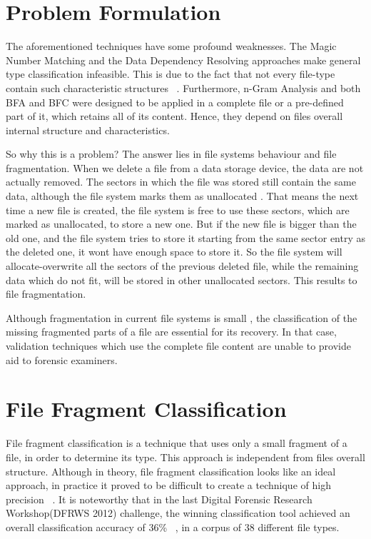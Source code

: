 \section{Problem Formulation}
The aforementioned techniques have some profound weaknesses. The Magic
Number Matching and the Data Dependency Resolving approaches make
general type classification infeasible. This is due to the fact that not every
file-type contain such characteristic structures ~\cite{MacDaniel}. Furthermore, n-Gram Analysis and both
BFA and BFC were designed to be applied in a complete file or a pre-defined
part of it, which retains all of its content. Hence, they depend on files overall internal structure and characteristics.

So why this is a problem? The answer lies in file systems behaviour and
file fragmentation. When we delete a file from a data storage device, the data are
not actually removed. The sectors in which the file was stored still contain
the same data, although the file system marks them as unallocated \cite{Pal}. That
means the next time a new file is created, the file system is free to use
these sectors, which are marked as unallocated, to store a new one. But
if the new file is bigger than the old one, and the file system tries to store it
starting from the same sector entry as the deleted one, it wont have enough
space to store it. So the file system will allocate-overwrite all the sectors of the previous deleted file, while the remaining data which do not fit, will be stored in
other unallocated sectors. This results to file fragmentation.

Although fragmentation in current file systems is small \cite{Garfinkel}, the classification of the missing fragmented parts of a file are essential for its recovery. In that case, validation techniques which use the complete file content
are unable to provide aid to forensic examiners. %

\section{File Fragment Classification}
File fragment classification is a technique that uses only a small fragment
of a file, in order to determine its type. This approach is independent from files overall structure. Although in theory, file fragment classification looks like an ideal approach, in practice it proved to be difficult to create a technique of high precision ~\cite{Ashim}. It is noteworthy that in the last Digital Forensic Research Workshop(DFRWS 2012) challenge, the winning classification tool achieved an overall classification accuracy of 36\% ~\cite{Sceadan}, in a corpus of 38 different file types.

